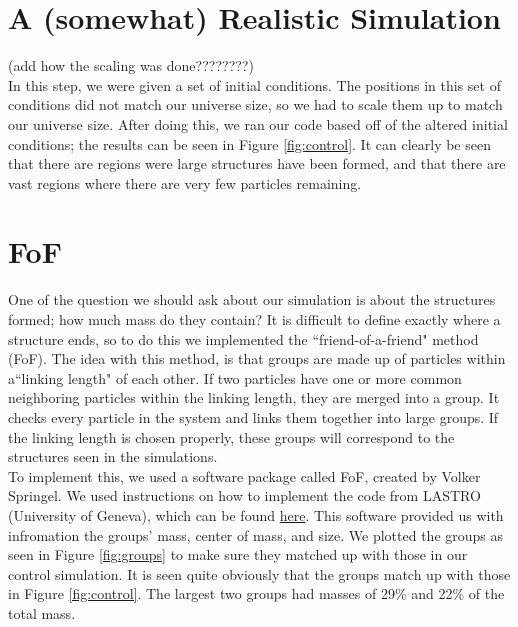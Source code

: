 \documentclass[10pt]{article}
\begin{document}
\section{A (somewhat) Realistic Simulation}
(add how the scaling was done????????)\\ 
	In this step, we were given a set of initial conditions. The positions in this set of conditions did not match our universe size, so we had to scale them up to match our universe size. After doing this, we ran our code based off of the altered initial conditions; the results can be seen in Figure \ref{fig:control}{}. It can clearly be seen that there are regions were large structures have been formed, and that there are vast regions where there are very few particles remaining.
	
	
\section{FoF}
	One of the question we should ask about our simulation is about the structures formed; how much mass do they contain? It is difficult to define exactly where a structure ends, so to do this we implemented the ``friend-of-a-friend" method (FoF). The idea with this method, is that groups are made up of particles within a``linking length" of each other. If two particles have one or more common neighboring particles within the linking length, they are merged into a group. It checks every particle in the system and links them together into large groups. If the linking length is chosen properly, these groups will correspond to the structures seen in the simulations.\\
	To implement this, we used a software package called FoF, created by Volker Springel. We used instructions on how to implement the code from LASTRO (University of Geneva), which can be found \href{http://obswww.unige.ch/lastro/misc/TP4/doc/rst/Exercices/Ex05.html#extracting-haloes}{here}. This software provided us with infromation the groups' mass, center of mass, and size. We plotted the groups as seen in Figure \ref{fig:groups}{} to make sure they matched up with those in our control simulation. It is seen quite obviously that the groups match up with those in Figure \ref{fig:control}. The largest two groups had masses of 29\% and 22\% of the total mass.
\end{document}
